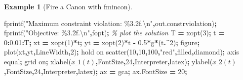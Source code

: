 \documentclass[
]{book}
\newenvironment{Shaded}{\begin{snugshade}}{\end{snugshade}}
\newcommand{\CommentTok}[1]{\textcolor[rgb]{0.56,0.35,0.01}{\textit{#1}}}
\newcommand{\FloatTok}[1]{\textcolor[rgb]{0.00,0.00,0.81}{#1}}
\newcommand{\NormalTok}[1]{#1}
\newcommand{\OperatorTok}[1]{\textcolor[rgb]{0.81,0.36,0.00}{\textbf{#1}}}
\newcommand{\SpecialStringTok}[1]{\textcolor[rgb]{0.31,0.60,0.02}{#1}}
\newcommand{\StringTok}[1]{\textcolor[rgb]{0.31,0.60,0.02}{#1}}
\newcommand{\VariableTok}[1]{\textcolor[rgb]{0.00,0.00,0.00}{#1}}
\theoremstyle{definition}
\theoremstyle{definition}
\newtheorem{example}{Example}[chapter]
\theoremstyle{definition}
\theoremstyle{definition}
\theoremstyle{remark}
\begin{document}
\begin{example}[Fire a Canon with fmincon]
\begin{Shaded}
\begin{Highlighting}[]
\VariableTok{fprintf}\NormalTok{(}\StringTok{"Maximum constraint violation: \%3.2f.\textbackslash{}n"}\OperatorTok{,}\VariableTok{out}\NormalTok{.}\VariableTok{constrviolation}\NormalTok{)}\OperatorTok{;}
\VariableTok{fprintf}\NormalTok{(}\StringTok{"Objective: \%3.2f.\textbackslash{}n"}\OperatorTok{,}\VariableTok{fopt}\NormalTok{)}\OperatorTok{;}
\CommentTok{\% plot the solution}
\VariableTok{T} \OperatorTok{=} \VariableTok{xopt}\NormalTok{(}\FloatTok{3}\NormalTok{)}\OperatorTok{;}
\VariableTok{t} \OperatorTok{=} \FloatTok{0}\OperatorTok{:}\FloatTok{0.01}\OperatorTok{:}\VariableTok{T}\OperatorTok{;}
\VariableTok{xt} \OperatorTok{=} \VariableTok{xopt}\NormalTok{(}\FloatTok{1}\NormalTok{)}\OperatorTok{*}\VariableTok{t}\OperatorTok{;}
\VariableTok{yt} \OperatorTok{=} \VariableTok{xopt}\NormalTok{(}\FloatTok{2}\NormalTok{)}\OperatorTok{*}\VariableTok{t} \OperatorTok{{-}} \FloatTok{0.5}\OperatorTok{*}\VariableTok{g}\OperatorTok{*}\NormalTok{(}\VariableTok{t}\OperatorTok{.\^{}}\FloatTok{2}\NormalTok{)}\OperatorTok{;}
\VariableTok{figure}\OperatorTok{;}
\VariableTok{plot}\NormalTok{(}\VariableTok{xt}\OperatorTok{,}\VariableTok{yt}\OperatorTok{,}\SpecialStringTok{\textquotesingle{}LineWidth\textquotesingle{}}\OperatorTok{,}\FloatTok{2}\NormalTok{)}\OperatorTok{;}
\VariableTok{hold} \VariableTok{on}
\VariableTok{scatter}\NormalTok{(}\FloatTok{10}\OperatorTok{,}\FloatTok{10}\OperatorTok{,}\FloatTok{100}\OperatorTok{,}\StringTok{"red"}\OperatorTok{,}\SpecialStringTok{\textquotesingle{}filled\textquotesingle{}}\OperatorTok{,}\SpecialStringTok{\textquotesingle{}diamond\textquotesingle{}}\NormalTok{)}\OperatorTok{;}
\VariableTok{axis} \VariableTok{equal}\OperatorTok{;} \VariableTok{grid} \VariableTok{on}\OperatorTok{;}
\VariableTok{xlabel}\NormalTok{(}\SpecialStringTok{\textquotesingle{}$x\_1(t)$\textquotesingle{}}\OperatorTok{,}\SpecialStringTok{\textquotesingle{}FontSize\textquotesingle{}}\OperatorTok{,}\FloatTok{24}\OperatorTok{,}\SpecialStringTok{\textquotesingle{}Interpreter\textquotesingle{}}\OperatorTok{,}\SpecialStringTok{\textquotesingle{}latex\textquotesingle{}}\NormalTok{)}\OperatorTok{;}
\VariableTok{ylabel}\NormalTok{(}\SpecialStringTok{\textquotesingle{}$x\_2(t)$\textquotesingle{}}\OperatorTok{,}\SpecialStringTok{\textquotesingle{}FontSize\textquotesingle{}}\OperatorTok{,}\FloatTok{24}\OperatorTok{,}\SpecialStringTok{\textquotesingle{}Interpreter\textquotesingle{}}\OperatorTok{,}\SpecialStringTok{\textquotesingle{}latex\textquotesingle{}}\NormalTok{)}\OperatorTok{;}
\VariableTok{ax} \OperatorTok{=} \VariableTok{gca}\OperatorTok{;} \VariableTok{ax}\NormalTok{.}\VariableTok{FontSize} \OperatorTok{=} \FloatTok{20}\OperatorTok{;}

\end{Highlighting}
\end{Shaded}
\end{example}
\end{document}
